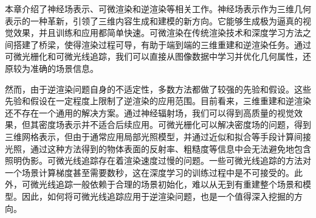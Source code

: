 本章介绍了神经场表示、可微渲染和逆渲染等相关工作。神经场表示作为三维几何表示的一种革新，引领了三维内容生成和建模的新方向。它能够生成极为逼真的视觉效果，并且训练和应用都简单快速。可微渲染在传统渲染技术和深度学习方法之间搭建了桥梁，使得渲染过程可导，有助于端到端的三维重建和逆渲染任务。通过可微光栅化和可微光线追踪，我们可以直接从图像数据中学习并优化几何属性，还原较为准确的场景信息。

然而，由于逆渲染问题自身的不适定性，多数方法都做了较强的先验和假设。这些先验和假设在一定程度上限制了逆渲染的应用范围。目前看来，三维重建和逆渲染还不存在一个通用的解决方案。通过神经辐射场，我们可以得到高质量的视觉效果，但其密度场表示并不适合后续应用。可微光栅化可以解决密度场的问题，得到三维网格表示，但由于通常应用局部光照模型，并通过近似和拟合等手段计算间接光照，通过这种方法得到的物体表面的反射率、粗糙度等信息中会无法避免地包含照明伪影。可微光线追踪存在着渲染速度过慢的问题。一些可微光线追踪的方法对一个场景计算梯度甚至需要数秒，这在深度学习的训练过程中是不可接受的。此外，可微光线追踪一般依赖于合理的场景初始化，难以从无到有重建整个场景和模型。因此，如何将可微光线追踪应用于逆渲染问题，也是一个值得深入挖掘的方向。
